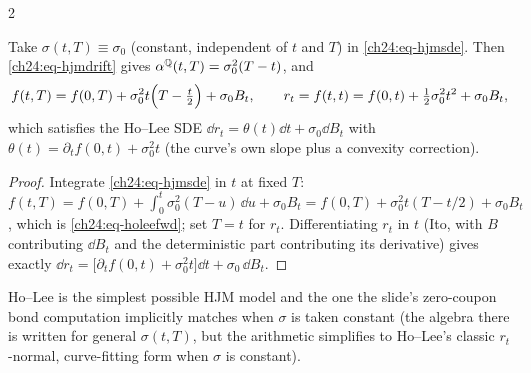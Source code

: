 \begin{paracol}{2}
\begin{proposition}\label{ch24:prop-holee}
Take $\sigma(t,T)\equiv\sigma_0$ (constant, independent of $t$ and $T$) in \eqref{ch24:eq-hjmsde}. Then \eqref{ch24:eq-hjmdrift} gives $\alpha^{\mathbb{Q}}(t,T)=\sigma_0^2(T-t)$, and
\begin{equation}\label{ch24:eq-holeefwd}
  f(t,T)=f(0,T)+\sigma_0^2t\Bigl(T-\tfrac t2\Bigr)+\sigma_0B_t ,\qquad r_t=f(t,t)=f(0,t)+\tfrac12\sigma_0^2t^2+\sigma_0B_t ,
\end{equation}
which satisfies the Ho--Lee SDE $\dd r_t=\theta(t)\dd t+\sigma_0\dd B_t$ with $\theta(t)=\partial_tf(0,t)+\sigma_0^2t$ (the curve's own slope plus a convexity correction).
\end{proposition}
\begin{proof}
Integrate \eqref{ch24:eq-hjmsde} in $t$ at fixed $T$: $f(t,T)=f(0,T)+\int_0^t\sigma_0^2(T-u)\,\dd u+\sigma_0B_t=f(0,T)+\sigma_0^2t(T-t/2)+\sigma_0B_t$, which is \eqref{ch24:eq-holeefwd}; set $T=t$ for $r_t$. Differentiating $r_t$ in $t$ (Ito, with $B$ contributing $\dd B_t$ and the deterministic part contributing its derivative) gives exactly $\dd r_t=\bigl[\partial_tf(0,t)+\sigma_0^2t\bigr]\dd t+\sigma_0\,\dd B_t$.
\end{proof}
Ho--Lee is the simplest possible HJM model and the one the slide's zero-coupon bond computation implicitly matches when $\sigma$ is taken constant  (the algebra there is written for general $\sigma(t,T)$, but the arithmetic simplifies to Ho--Lee's classic $r_t$-normal, curve-fitting form when $\sigma$ is constant).


\end{paracol}
